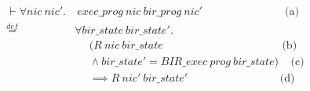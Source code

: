 \documentclass{kththesis}
\newcommand{\eqdef}{\stackrel{def}{=}}
\begin{document}
\begin{small}
\begin{equation}
\begin{split}
  \vdash \forall nic~nic'. &~exec\_prog~nic~bir\_prog~nic' ~~~~~~~~~~~~~~~~~~~~~~~~~~~~~~~~~~ \text{(a)}\\
    \eqdef~&\forall bir\_state~bir\_state'.\\
          & ~~~~~~ (R~nic~bir\_state ~~~~~~~~~~~~~~~~~~~~~~~~~~~~~~~~~~~~~~~~~~~~~~~~~ \text{(b)}\\
          & ~~~~~~ \land bir\_state' = BIR\_exec~prog~bir\_state) ~~~~~ \text{(c)}\\
          & ~~~~~~ \implies R~nic'~bir\_state' ~~~~~~~~~~~~~~~~~~~~~~~~~~~~~~~~~~~~~~ \text{(d)}
\end{split}
\label{proof_eq_thm}
\end{equation}
\end{small}
\end{document}
